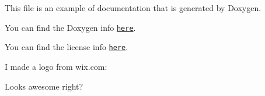 This file is an example of documentation that is generated by Doxygen.

You can find the Doxygen info \href{http://www.stack.nl/~dimitri/doxygen/index.html}{\tt here}.

You can find the license info \href{https://choosealicense.com/}{\tt here}.

I made a logo from wix.\+com\+:



Looks awesome right? 